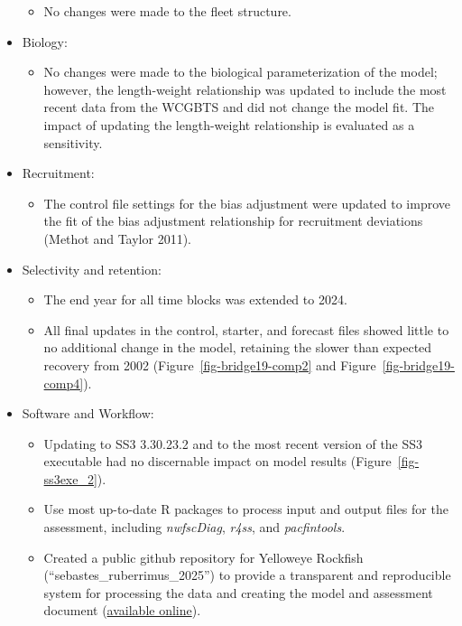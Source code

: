 \documentclass[
]{scrartcl}
\providecommand{\tightlist}{%
  \setlength{\itemsep}{0pt}\setlength{\parskip}{0pt}}\usepackage{longtable,booktabs,array}
\begin{document}
\begin{itemize}
  \begin{itemize}
  \tightlist
  \item
    No changes were made to the fleet structure.
  \end{itemize}
\item
  Biology:

  \begin{itemize}
  \tightlist
  \item
    No changes were made to the biological parameterization of the
    model; however, the length-weight relationship was updated to
    include the most recent data from the WCGBTS and did not change the
    model fit. The impact of updating the length-weight relationship is
    evaluated as a sensitivity.
  \end{itemize}
\item
  Recruitment:

  \begin{itemize}
  \tightlist
  \item
    The control file settings for the bias adjustment were updated to
    improve the fit of the bias adjustment relationship for recruitment
    deviations (Methot and Taylor 2011).
  \end{itemize}
\item
  Selectivity and retention:

  \begin{itemize}
  \tightlist
  \item
    The end year for all time blocks was extended to 2024.
  \item
    All final updates in the control, starter, and forecast files showed
    little to no additional change in the model, retaining the slower
    than expected recovery from 2002 (Figure~\ref{fig-bridge19-comp2}
    and Figure~\ref{fig-bridge19-comp4}).
  \end{itemize}
\item
  Software and Workflow:

  \begin{itemize}
  \tightlist
  \item
    Updating to SS3 3.30.23.2 and to the most recent version of the SS3
    executable had no discernable impact on model results
    (Figure~\ref{fig-ss3exe_2}).
  \item
    Use most up-to-date R packages to process input and output files for
    the assessment, including \emph{nwfscDiag}, \emph{r4ss}, and
    \emph{pacfintools}.
  \item
    Created a public github repository for Yelloweye Rockfish
    (``sebastes\_ruberrimus\_2025'') to provide a transparent and
    reproducible system for processing the data and creating the model
    and assessment document
    (\href{https://github.com/rclairer/Sebastes_ruberrimus_2025}{available
    online}).
  \end{itemize}
\end{itemize}
\end{document}

